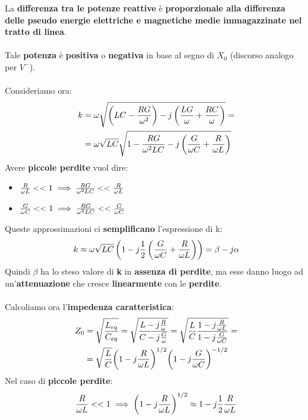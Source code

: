 La \textbf{differenza tra le potenze reattive} è \textbf{proporzionale alla differenza delle pseudo energie elettriche e magnetiche medie immagazzinate nel tratto di linea}.\\ \\
Tale \textbf{potenza} è \textbf{positiva} o \textbf{negativa} in base al segno di $X_0$ (discorso analogo per $V^-$).\\ \\
Consideriamo ora:
\begin{equation*}
\begin{aligned}
    k &= \omega \sqrt{\left(LC - \frac{RG}{\omega^2} \right)- j\left(\frac{LG}{\omega} + \frac{RC}{\omega} \right)} =\\
    &=\omega \sqrt{LC}\sqrt{1 - \frac{RG}{\omega^2 LC} - j\left(\frac{G}{\omega C} + \frac{R}{\omega L} \right) }
\end{aligned}
\end{equation*}
Avere \textbf{piccole perdite} vuol dire:
\begin{itemize}
    \item $\frac{R}{\omega L} << 1 \implies \frac{RG}{\omega^2 LC} << \frac{R}{\omega L}$\\
     \item $\frac{G}{\omega C} << 1 \implies \frac{RG}{\omega^2 LC} << \frac{G}{\omega C}$
\end{itemize}
Queste approssimazioni ci \textbf{semplificano} l'espressione di k:
\begin{equation*}
    k \approx \omega \sqrt{LC} \left(1 - j \frac{1}{2} \left(\frac{G}{\omega C} + \frac{R}{\omega L}\right)\right) = \beta  - j \alpha
\end{equation*}
Quindi $\beta$ ha lo steso valore di \textbf{k} in \textbf{assenza di perdite}, ma esse danno luogo ad un'\textbf{attenuazione} che cresce \textbf{linearmente} con le \textbf{perdite}.\\ \\
Calcoliamo ora l'\textbf{impedenza caratteristica}:
\begin{equation*}
\begin{aligned}
    Z_0 &= \sqrt{\frac{L_{eq}}{C_{eq}}} = \sqrt{\frac{L - j \frac{R}{\omega}}{C - j \frac{G}{\omega}}} = \sqrt{\frac{L}{C} \frac{1 - j \frac{R}{\omega L}}{1 - j \frac{G}{\omega C}}} =\\
    &= \sqrt{\frac{L}{C}} {\left(1 - j \frac{R}{\omega L}\right)}^{1/2}{\left(1 - j \frac{G}{\omega C}\right)}^{-1/2}
\end{aligned}
\end{equation*}
Nel caso di \textbf{piccole perdite}:
\begin{equation*}
    \frac{R}{\omega L} << 1 \implies {\left(1 - j \frac{R}{\omega L}\right)}^{1/2} \approx 1 - j \frac{1}{2} \frac{R}{\omega L}
\end{equation*}
